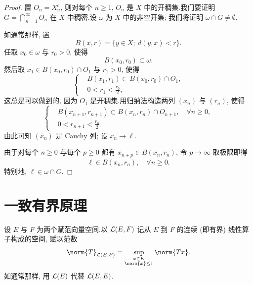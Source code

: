 \begin{proof}
置 $O_n=X_n^c$, 则对每个 $n\ge1$, $O_n$ 是 $X$ 中的开稠集.我们要证明
$G=\bigcap_{n=1}^\infty O_n$ 在 $X$ 中稠密.设 $\omega$ 为 $X$ 中的非空开集;
我们将证明 $\omega\cap G\ne\emptyset$.

如通常那样, 置
\begin{equation*}
B(x,r)=\{y\in X;\ d(y,x)<r\}.
\end{equation*}
任取 $x_0\in\omega$ 与 $r_0>0$, 使得
\begin{equation*}
B(x_0,r_0)\subset\omega.
\end{equation*}
然后取 $x_1\in B(x_0,r_0)\cap O_1$ 与 $r_1>0$, 使得
\begin{equation*}
\left\{\begin{aligned}
	&B(x_1,r_1)\subset B(x_0,r_0)\cap O_1,\\
	&0<r_1<\frac{r_0}{2},
\end{aligned}\right.
\end{equation*}
这总是可以做到的, 因为 $O_1$ 是开稠集.用归纳法构造两列 $(x_n)$ 与 $(r_n)$, 使得
\begin{equation*}
\left\{\begin{aligned}
	&B(x_{n+1},r_{n+1})\subset B(x_n,r_n)\cap O_{n+1},\quad \forall n\ge0,\\
	&0<r_{n+1}<\frac{r_n}{2}.
\end{aligned}\right.
\end{equation*}
由此可知 $(x_n)$ 是 Cauchy 列; 设 $x_n\to\ell$.

由于对每个 $n\ge0$ 与每个 $p\ge0$ 都有 $x_{n+p}\in B(x_n,r_n)$, 令 $p\to\infty$
取极限即得
\begin{equation*}
\ell\in\overline{B(x_n,r_n)},\quad \forall n\ge0.
\end{equation*}
特别地, $\ell\in\omega\cap G$.
\end{proof}

\section{一致有界原理}
\label{sec:2.2}

\begin{notation}
设 $E$ 与 $F$ 为两个赋范向量空间.以 $\mathcal{L}(E,F)$ 记从 $E$ 到 $F$ 的连续 (即有界)
线性算子构成的空间, 赋以范数
\begin{equation*}
\norm{T}_{\LL(E,F)}=\sup_{\substack{x\in E\\ \norm{x}\le1}}\norm{Tx}.
\end{equation*}
如通常那样, 用 $\mathcal{L}(E)$ 代替 $\mathcal{L}(E,E)$.
\end{notation}

